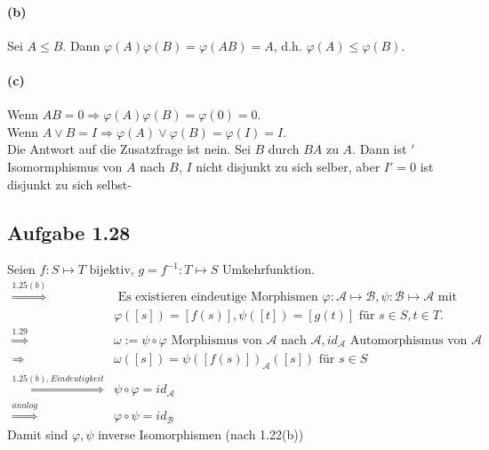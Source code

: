 \documentclass[10pt, a4paper]{article}
\begin{document}
\paragraph*{(b)}
Sei $A \leq B$. Dann $\varphi(A)\varphi(B)=\varphi(AB)=A$, d.h. $\varphi(A)\leq\varphi(B)$.


\paragraph*{(c)}
Wenn $AB=0 \Rightarrow \varphi(A)\varphi(B)=\varphi(0)=0$.	\\
Wenn $A\vee B = I\Rightarrow \varphi(A)\vee\varphi(B)=\varphi(I)=I$.	\\
Die Antwort auf die Zusatzfrage ist nein. Sei $B$ durch $BA$ zu $A$. Dann ist $'$ Isomormphismus von $A$ nach $B$, $I$ nicht disjunkt zu sich selber, aber $I'=0$ ist disjunkt zu sich selbst-


\subsection{Aufgabe 1.28} Seien $f:S\mapsto T \text{ bijektiv, } g=f^{-1}:T\mapsto S$ Umkehrfunktion.
\begin{align*}
	\stackrel{1.25(b)}{\Longrightarrow} &\text{ Es existieren eindeutige Morphismen }\varphi:\mathcal{A}\mapsto\mathcal{B}, \psi:\mathcal{B}\mapsto\mathcal{A} \text{ mit }	\\
	&\varphi([s])=[f(s)], \psi([t])=[g(t)] \text{ für } s\in S, t\in T.	\\
	\stackrel{1.29}{\Longrightarrow} \hspace{5pt} &\omega:=\psi\circ\varphi\text{ Morphismus von } \mathcal{A} \text{ nach } \mathcal{A}, id_{\mathcal{A}} \text{ Automorphismus von } \mathcal{A}	\\
	\Rightarrow \hspace{5pt} &\omega([s])=\psi([f(s)])_{\mathcal{A}}([s])\text{ für } s\in S	\\
	\stackrel{1.25(b), Eindeutigkeit}{\Longrightarrow} &\psi\circ\varphi=id_{\mathcal{A}}	\\
	\stackrel{analog}{\Longrightarrow} &\varphi\circ\psi=id_{\mathcal{B}}
\end{align*}
Damit sind $\varphi, \psi$ inverse Isomorphismen (nach 1.22(b))
\end{document}
